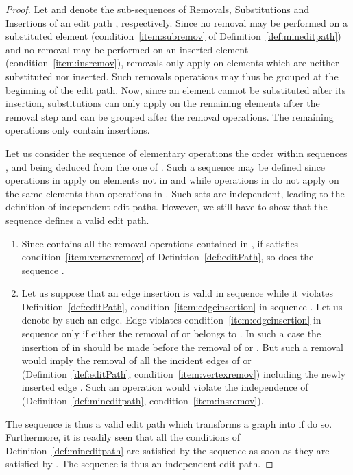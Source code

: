 \begin{proof}
  Let  and  denote the sub-sequences of
  Removals, Substitutions and Insertions of an edit path ,
  respectively. Since no removal may be performed on a substituted
  element (condition~\ref{item:subremov} of
  Definition~\ref{def:mineditpath}) and no removal may be performed on
  an inserted element (condition~\ref{item:insremov}), removals only
  apply on elements which are neither substituted nor inserted. Such
  removals operations may thus be grouped at the beginning of the edit
  path. Now, since an element cannot be substituted after its
  insertion, substitutions can only apply on the remaining elements after
  the removal step and can be grouped after the removal operations.  The
  remaining operations only contain insertions.

  Let us consider the sequence of elementary operations 
  the order within sequences ,  and  being deduced from the
  one of . Such a sequence may be defined since operations in 
  apply on elements not in  and  while operations in  do
  not apply on the same elements than operations in . Such sets
  are independent, leading to the definition of independent edit
  paths. However, we still have to show that the sequence 
  defines a valid edit path.
  \begin{enumerate}
  \item Since  contains all the removal operations contained in
    , if  satisfies condition~\ref{item:vertexremov} of
    Definition~\ref{def:editPath}, so does the sequence .
  \item Let us suppose that an edge insertion is valid in sequence
     while it violates Definition~\ref{def:editPath},
    condition~\ref{item:edgeinsertion} in sequence . Let us
    denote by  such an edge. Edge  violates
    condition~\ref{item:edgeinsertion} in sequence  only if
    either the removal of  or  belongs to .  In such a case
    the insertion of  in  should be made before the
    removal of  or . But such a removal would imply the
    removal of all the incident edges of  or 
    (Definition~\ref{def:editPath},
    condition~\ref{item:vertexremov}) including the newly inserted
    edge .  Such an operation would violate the independence
    of  (Definition~\ref{def:mineditpath},
    condition~\ref{item:insremov}).
  \end{enumerate}
  The sequence  is thus a valid edit path which transforms
  a graph  into  if  do so.
  Furthermore, it is readily seen that all the conditions of Definition~\ref{def:mineditpath}
  are satisfied by the sequence  as soon as they are satisfied by .
  The sequence  is thus an independent edit path.
\end{proof}
